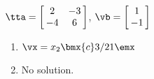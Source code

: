 {$\tta = \left[\hskip -3pt \begin{array}{cc} 2&-3\\  -4&6\end {array} \hskip -3pt
\right]$, $\vb=\left[\hskip -3pt \begin{array}{c} 1\\  -1\end {array} \hskip -3pt
 \right]$}
{\begin{enumerate}
\item	 $\vx=x_2\bmx{c}3/2\\1\emx$
\item	 No solution.
\end{enumerate}
 }







